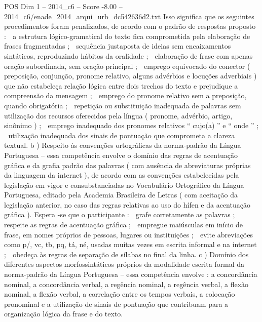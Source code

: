 \begin{textsample}{POS Dim 1 – 2014\_c6 – Score -8.00 – 2014\_c6/enade\_2014\_arqui\_urb\_dc542636d2.txt}
Isso significa que os seguintes procedimentos foram penalizados, de acordo com o padrão de respostas proposto :  a estrutura lógico-gramatical do texto fica comprometida pela elaboração de frases fragmentadas ;  sequência justaposta de ideias sem encaixamentos sintáticos, reproduzindo hábitos da oralidade ;  elaboração de frase com apenas oração subordinada, sem oração principal ;  emprego equivocado do conector ( preposição, conjunção, pronome relativo, alguns advérbios e locuções adverbiais ) que não estabeleça relação lógica entre dois trechos do texto e prejudique a compreensão da mensagem ;  emprego do pronome relativo sem a preposição, quando obrigatória ;  repetição ou substituição inadequada de palavras sem utilização dos recursos oferecidos pela língua ( pronome, advérbio, artigo, sinônimo ) ;  emprego inadequado dos pronomes relativos “ cujo(a) ” e “ onde ” ;  utilização inadequada dos sinais de pontuação que comprometa a clareza textual. b ) Respeito às convenções ortográficas da norma-padrão da Língua Portuguesa – essa competência envolve o domínio das regras de acentuação gráfica e da grafia padrão das palavras ( com ausência de abreviaturas próprias da linguagem da internet ), de acordo com as convenções estabelecidas pela legislação em vigor e consubstanciadas no Vocabulário Ortográfico da Língua Portuguesa, editado pela Academia Brasileira de Letras ( com aceitação da legislação anterior, no caso das regras relativas ao uso do hífen e da acentuação gráfica ).
Espera -se que o participante :  grafe corretamente as palavras ;  respeite as regras de acentuação gráfica ;  empregue maiúsculas em início de frase, em nomes próprios de pessoas, lugares ou instituições ;  evite abreviações como p/, vc, tb, pq, tá, né, usadas muitas vezes em escrita informal e na internet ;  obedeça às regras de separação de sílabas no final da linha. c ) Domínio dos diferentes aspectos morfossintáticos próprios da modalidade escrita formal da norma-padrão da Língua Portuguesa – essa competência envolve : a concordância nominal, a concordância verbal, a regência nominal, a regência verbal, a flexão nominal, a flexão verbal, a correlação entre os tempos verbais, a colocação pronominal e a utilização de sinais de pontuação que contribuam para a organização lógica da frase e do texto.

\end{textsample}
